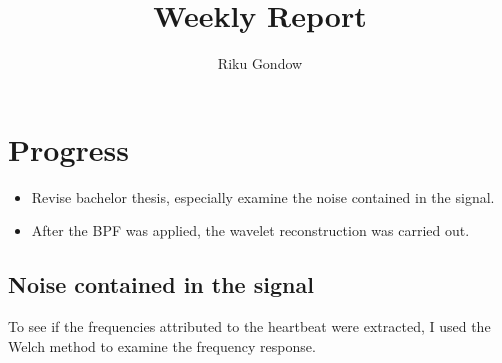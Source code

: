 \documentclass[dvipdfmx]{article}
\begin{document}
\title{Weekly Report}
\author{Riku Gondow}
\maketitle
\section{Progress}
\begin{itemize}
    \item Revise bachelor thesis, especially examine the noise contained in the signal.
    \item After the BPF was applied, the wavelet reconstruction was carried out.
\end{itemize}

\subsection{Noise contained in the signal}
To see if the frequencies attributed to the heartbeat were extracted, I used the Welch method to examine the frequency response.
\end{document}

